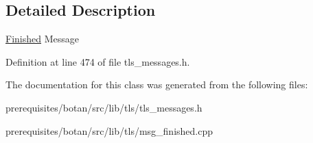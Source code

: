 \subsection{Detailed Description}
\mbox{\hyperlink{class_botan_1_1_t_l_s_1_1_finished}{Finished}} Message 

Definition at line 474 of file tls\+\_\+messages.\+h.



The documentation for this class was generated from the following files\+:\begin{DoxyCompactItemize}
\item 
prerequisites/botan/src/lib/tls/tls\+\_\+messages.\+h\item 
prerequisites/botan/src/lib/tls/msg\+\_\+finished.\+cpp\end{DoxyCompactItemize}
